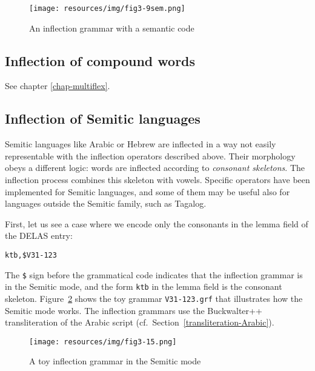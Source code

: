 \bigskip
\begin{figure}[!ht]
\begin{center}
\texttt{[image: resources/img/fig3-9sem.png]}
\caption{An inflection grammar with a semantic code\label{fig-inflection-sem}}
\end{center}
\end{figure}


\subsection{Inflection of compound words}
See chapter \ref{chap-multiflex}.


\subsection{Inflection of Semitic languages}
\label{subsection-semitic-inflection}
Semitic languages like Arabic or Hebrew are inflected in a way not easily representable 
with the inflection operators described above. Their morphology obeys a different logic:
words are inflected according to \textit{consonant
skeletons}. The inflection process combines this skeleton with vowels.
Specific operators have been implemented for Semitic languages, and some of them may be useful
also for languages outside the Semitic family, such as Tagalog.

\bigskip
\noindent First, let us see a case where we encode only the consonants in the lemma field of the DELAS  entry:

\bigskip
\noindent \verb+ktb,$V31-123+

\bigskip
\noindent The \verb+$+ sign before the grammatical code indicates that the inflection grammar 
is in the Semitic mode, and the form \verb+ktb+ in the lemma field is the consonant
skeleton. Figure~\ref{semitic-grammar} shows the toy grammar \verb+V31-123.grf+
that illustrates how the Semitic mode works. The inflection grammars use the Buckwalter++
transliteration of the Arabic script (cf.~Section~\ref{transliteration-Arabic}).

\bigskip
\begin{figure}[!ht]
\begin{center}
\texttt{[image: resources/img/fig3-15.png]}
\caption{A toy inflection grammar\label{semitic-grammar} in the Semitic mode}
\end{center}
\end{figure}

